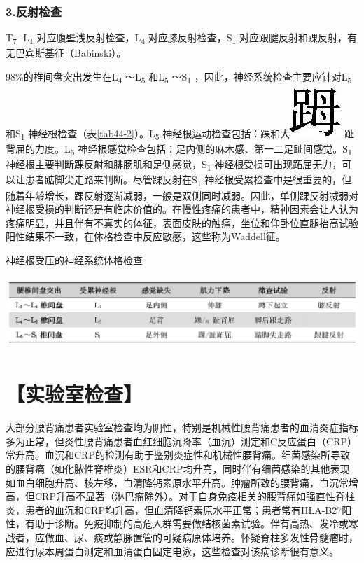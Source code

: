 \subsubsection{3.反射检查}

T\textsubscript{7} -L\textsubscript{1}
对应腹壁浅反射检查，L\textsubscript{4}
对应膝反射检查，S\textsubscript{1}
对应跟腱反射和踝反射，有无巴宾斯基征（Babinski）。

98\%的椎间盘突出发生在L\textsubscript{4} ～L\textsubscript{5}
和L\textsubscript{5} ～S\textsubscript{1}
，因此，神经系统检查主要应针对L\textsubscript{5} 和S\textsubscript{1}
神经根检查（表\ref{tab44-2}）。L\textsubscript{5}
神经根运动检查包括：踝和大\includegraphics{./images/Image00268.jpg}
趾背屈的力度。L\textsubscript{5}
神经根感觉检查包括：足内侧的麻木感、第一二足趾间感觉。S\textsubscript{1}
神经根主要判断踝反射和腓肠肌和足侧感觉，S\textsubscript{1}
神经根受损可出现跖屈无力，可以让患者踮脚尖走路来判断。尽管踝反射在S\textsubscript{1}
神经根受累检查中是很重要的，但随着年龄增长，踝反射逐渐减弱，一般是双侧同时减弱。因此，单侧踝反射减弱对神经根受损的判断还是有临床价值的。在慢性疼痛的患者中，精神因素会让人认为疼痛明显，并且伴有不真实的体征，表面皮肤的触痛，坐位和仰卧位直腿抬高试验阳性结果不一致，在体格检查中反应敏感，这些称为Waddell征。

\begin{table}[htbp]
\centering
\caption{神经根受压的神经系统体格检查}
\label{tab44-2}
\includegraphics[width=5.92708in,height=1.08333in]{./images/Image00269.jpg}
\end{table}

\section{【实验室检查】}

大部分腰背痛患者实验室检查均为阴性，特别是机械性腰背痛患者的血清炎症指标多为正常，但炎性腰背痛患者血红细胞沉降率（血沉）测定和C反应蛋白（CRP）常升高。血沉和CRP的检测有助于鉴别炎症性和机械性腰背痛。细菌感染所导致的腰背痛（如化脓性脊椎炎）ESR和CRP均升高，同时伴有细菌感染的其他表现如血白细胞升高、核左移，血清降钙素原水平升高。肿瘤所致的腰背痛，血沉常增高，但CRP升高不显著（淋巴瘤除外）。对于自身免疫相关的腰背痛如强直性脊柱炎，患者的血沉和CRP均升高，但血清降钙素原水平正常；患者常有HLA-B27阳性，有助于诊断。免疫抑制的高危人群需要做结核菌素试验。伴有高热、发冷或寒战者，应做血、尿、痰或静脉置管的可疑病原体培养。怀疑脊柱多发性骨髓瘤时，应进行尿本周蛋白测定和血清蛋白固定电泳，这些检查对该病诊断很有意义。


